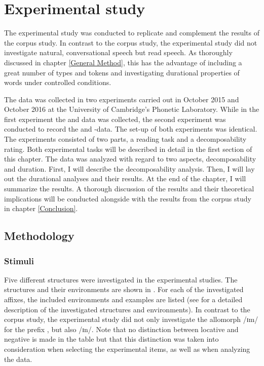 \chapter{Experimental study} \label{Experimental Studies}


The experimental study was conducted to replicate and complement the results of the corpus study. In contrast to the corpus study, the experimental study did not investigate natural, conversational speech but read speech. As thoroughly discussed in chapter \ref{General Method}, this has the advantage of including a great number of types and tokens and investigating durational properties of words under controlled conditions.

 The data was collected in two experiments carried out in October 2015 and October 2016 at the University of Cambridge's Phonetic Laboratory. While in the first experiment the  and data was collected, the second experiment was conducted to record the  and -data. 
  The set-up of both experiments was identical. The experiments consisted of two parts, a reading task and a decomposability rating. 
 Both experimental tasks will be described in detail in the first section of this chapter.
 The data was analyzed with regard to two aspects, decomposability and duration. First, I will describe the decomposability analysis.  Then, I will lay out the durational analyses and their results. At the end of the chapter, I will summarize the results. A thorough discussion of the results and their theoretical implications will be conducted alongside with the results from the corpus study in chapter \ref{Conclusion}.



\section{Methodology}


\subsection{Stimuli} \label{stimuli experiment}

 Five different structures were investigated in the experimental studies. The structures and their environments are shown in . For each of the investigated affixes, the included environments and examples are listed (see  for a detailed description of the investigated structures and environments). In contrast to the corpus study, the experimental study did not only investigate the allomorph /ɪm/ for the prefix , but also /ɪn/. Note that no distinction between locative and negative  is made in the table but that this distinction was taken into consideration when selecting the experimental items, as well as when analyzing the data.



